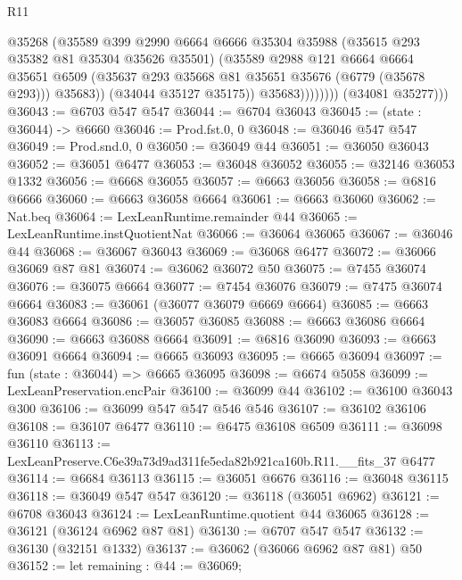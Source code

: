 \begin{lexlean}{R11}
\begin{coremodule}
                          @35268
                          (@35589
                            @399
                            @2990
                            @6664
                            @6666
                            @35304
                            @35988
                            (@35615 @293 @35382 @81 @35304 @35626 @35501)
                            (@35589
                              @2988
                              @121
                              @6664
                              @6664
                              @35651
                              @6509
                              (@35637 @293 @35668 @81 @35651 @35676 (@6779 (@35678 @293)))
                              @35683))
                          (@34044 @35127 @35175))
                        @35683))))))))
        (@34081 @35277)))
@36043 := @6703 @547 @547
@36044 := @6704 @36043
@36045 := (state : @36044) -> @6660
@36046 := Prod.fst.{0, 0}
@36048 := @36046 @547 @547
@36049 := Prod.snd.{0, 0}
@36050 := @36049 @44
@36051 := @36050 @36043
@36052 := @36051 @6477
@36053 := @36048 @36052
@36055 := @32146 @36053 @1332
@36056 := @6668 @36055
@36057 := @6663 @36056
@36058 := @6816 @6666
@36060 := @6663 @36058 @6664
@36061 := @6663 @36060
@36062 := Nat.beq
@36064 := LexLeanRuntime.remainder @44
@36065 := LexLeanRuntime.instQuotientNat
@36066 := @36064 @36065
@36067 := @36046 @44
@36068 := @36067 @36043
@36069 := @36068 @6477
@36072 := @36066 @36069 @87 @81
@36074 := @36062 @36072 @50
@36075 := @7455 @36074
@36076 := @36075 @6664
@36077 := @7454 @36076
@36079 := @7475 @36074 @6664
@36083 := @36061 (@36077 @36079 @6669 @6664)
@36085 := @6663 @36083 @6664
@36086 := @36057 @36085
@36088 := @6663 @36086 @6664
@36090 := @6663 @36088 @6664
@36091 := @6816 @36090
@36093 := @6663 @36091 @6664
@36094 := @6665 @36093
@36095 := @6665 @36094
@36097 := fun (state : @36044) => @6665 @36095
@36098 := @6674 @5058
@36099 := LexLeanPreservation.encPair
@36100 := @36099 @44
@36102 := @36100 @36043 @300
@36106 := @36099 @547 @547 @546 @546
@36107 := @36102 @36106
@36108 := @36107 @6477
@36110 := @6475 @36108 @6509
@36111 := @36098 @36110
@36113 := LexLeanPreserve.C6e39a73d9ad311fe5eda82b921ca160b.R11.__fits_37 @6477
@36114 := @6684 @36113
@36115 := @36051 @6676
@36116 := @36048 @36115
@36118 := @36049 @547 @547
@36120 := @36118 (@36051 @6962)
@36121 := @6708 @36043
@36124 := LexLeanRuntime.quotient @44 @36065
@36128 := @36121 (@36124 @6962 @87 @81)
@36130 := @6707 @547 @547
@36132 := @36130 (@32151 @1332)
@36137 := @36062 (@36066 @6962 @87 @81) @50
@36152 := let remaining : @44 := @36069;

\end{coremodule}
\end{lexlean}
